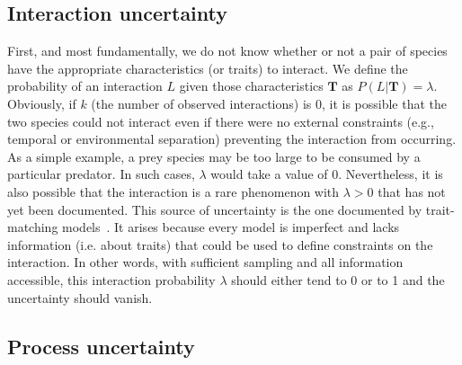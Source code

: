 \documentclass[12pt]{article}
\begin{document}
\begin{spacing}{2.0}
    \subsection*{Interaction uncertainty} 

    First, and most fundamentally, we do not know whether or not a pair of species have the appropriate characteristics (or traits) to interact. We define the probability of an interaction $L$ given those characteristics $\mathbf{T}$ as $P(L | \mathbf{T})=\lambda$. Obviously, if $k$ (the number of observed interactions) is 0, it is possible that the two species could not interact even if there were no external constraints (e.g., temporal or environmental separation) preventing the interaction from occurring. As a simple example, a prey species may be too large to be consumed by a particular predator. In such cases, $\lambda$ would take a value of 0. 
    Nevertheless, it is also possible that the interaction is a rare phenomenon with $\lambda>0$ that has not yet been documented. This source of uncertainty is the one documented by trait-matching models~\citep{Bartomeus2016}. It arises because every model is imperfect and lacks information (i.e. about traits) that could be used to define constraints on the interaction. In other words, with sufficient sampling and all information accessible, this interaction probability $\lambda$ should either tend to 0 or to 1 and the uncertainty should vanish. 

    \subsection*{Process uncertainty} 


\end{spacing}
\end{document}
